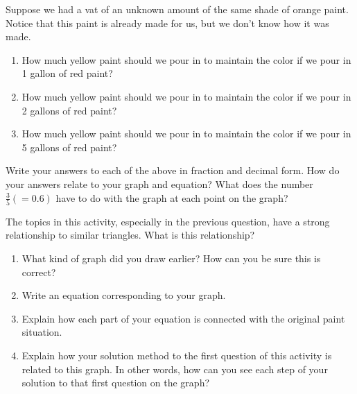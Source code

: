 \documentclass[nooutcomes]{ximera}
\begin{document}
 

\begin{problem} \label{Orange4}
Suppose we had a vat of an unknown amount of the same shade of orange paint.  Notice that this paint is already made for us, but we don't know how it was made.
\begin{enumerate}
    \item How much yellow paint should we pour in to maintain the color if we pour in 1 gallon of red paint?
    \item How much yellow paint should we pour in to maintain the color if we pour in 2 gallons of red paint?
    \item How much yellow paint should we pour in to maintain the color if we pour in 5 gallons of red paint?
\end{enumerate}
Write your answers to each of the above in fraction and decimal form.  How do your answers relate to your graph and equation?  What does the number $\frac35  (= 0.6)$ have to do with the graph at each point on the graph?
\end{problem}


\begin{problem} \label{Orange5}
The topics in this activity, especially in the previous question, have a strong relationship to similar triangles.  What is this relationship?
\end{problem}



\begin{problem} \label{Orange6}
\begin{enumerate}
    \item What kind of graph did you draw earlier?  How can you be sure this is correct?
    \item Write an equation corresponding to your graph.
    \item Explain how each part of your equation is connected with the original paint situation.
    \item Explain how your solution method to the first question of this activity is related to this graph.  In other words, how can you see each step of your solution to that first question on the graph?
\end{enumerate}
\end{problem}
\end{document}

